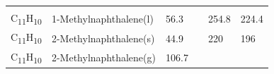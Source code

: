 \documentclass[
  9pt,
]{extbook}
\theoremstyle{definition}
\theoremstyle{definition}
\theoremstyle{definition}
\theoremstyle{remark}
\begin{document}
\begin{longtable}[]{@{}llllll@{}}
\begin{minipage}[t]{0.14\columnwidth}
\strut
\end{minipage}\tabularnewline
\begin{minipage}[t]{0.07\columnwidth}\raggedright
C\textsubscript{11}H\textsubscript{10}\strut
\end{minipage} & \begin{minipage}[t]{0.17\columnwidth}\raggedright
1-Methylnaphthalene(l)\strut
\end{minipage} & \begin{minipage}[t]{0.15\columnwidth}\raggedright
56.3\strut
\end{minipage} & \begin{minipage}[t]{0.15\columnwidth}\raggedright
\strut
\end{minipage} & \begin{minipage}[t]{0.14\columnwidth}\raggedright
254.8\strut
\end{minipage} & \begin{minipage}[t]{0.14\columnwidth}\raggedright
224.4\strut
\end{minipage}\tabularnewline
\begin{minipage}[t]{0.07\columnwidth}\raggedright
C\textsubscript{11}H\textsubscript{10}\strut
\end{minipage} & \begin{minipage}[t]{0.17\columnwidth}\raggedright
2-Methylnaphthalene(s)\strut
\end{minipage} & \begin{minipage}[t]{0.15\columnwidth}\raggedright
44.9\strut
\end{minipage} & \begin{minipage}[t]{0.15\columnwidth}\raggedright
\strut
\end{minipage} & \begin{minipage}[t]{0.14\columnwidth}\raggedright
220\strut
\end{minipage} & \begin{minipage}[t]{0.14\columnwidth}\raggedright
196\strut
\end{minipage}\tabularnewline
\begin{minipage}[t]{0.07\columnwidth}\raggedright
C\textsubscript{11}H\textsubscript{10}\strut
\end{minipage} & \begin{minipage}[t]{0.17\columnwidth}\raggedright
2-Methylnaphthalene(g)\strut
\end{minipage} & \begin{minipage}[t]{0.15\columnwidth}\raggedright
106.7\strut
\end{minipage} & \begin{minipage}[t]{0.15\columnwidth}\raggedright

\end{minipage}
\end{longtable}
\end{document}
